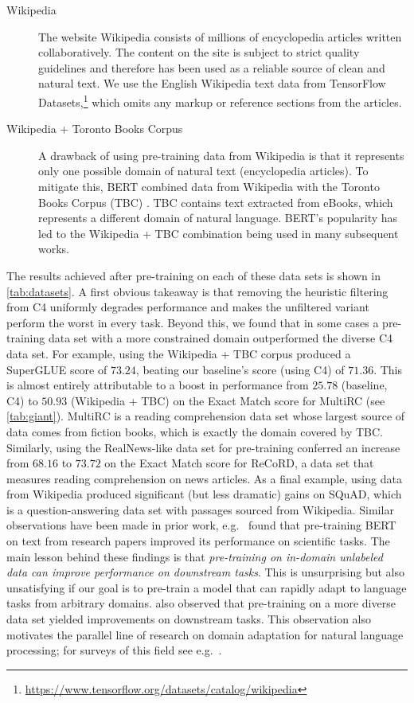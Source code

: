 \begin{description}
\item[Wikipedia] The website Wikipedia consists of millions of encyclopedia articles written collaboratively. The content on the site is subject to strict quality guidelines and therefore has been used as a reliable source of clean and natural text. We use the English Wikipedia text data from TensorFlow Datasets,\footnote{\url{https://www.tensorflow.org/datasets/catalog/wikipedia}} which omits any markup or reference sections from the articles.

\item[Wikipedia + Toronto Books Corpus] A drawback of using pre-training data from Wikipedia is that it represents only one possible domain of natural text (encyclopedia articles). To mitigate this, BERT \citep{devlin2018bert} combined data from Wikipedia with the Toronto Books Corpus (TBC) \citep{zhu2015aligning}. TBC contains text extracted from eBooks, which represents a different domain of natural language. BERT's popularity has led to the Wikipedia + TBC combination being used in many subsequent works.

\end{description}

The results achieved after pre-training on each of these data sets is shown in \ref{tab:datasets}.
A first obvious takeaway is that removing the heuristic filtering from C4 uniformly degrades performance and makes the unfiltered variant perform the worst in every task. Beyond this, we found that in some cases a pre-training data set with a more constrained domain outperformed the diverse C4 data set. For example, using the Wikipedia + TBC corpus produced a SuperGLUE score of $73.24$, beating our baseline's score (using C4) of $71.36$. This is almost entirely attributable to a boost in performance from $25.78$ (baseline, C4) to $50.93$ (Wikipedia + TBC) on the Exact Match score for MultiRC (see \ref{tab:giant}).
MultiRC is a reading comprehension data set whose largest source of data comes from fiction books, which is exactly the domain covered by TBC. Similarly, using the RealNews-like data set for pre-training conferred an increase from $68.16$ to $73.72$ on the Exact Match score for ReCoRD, a data set that measures reading comprehension on news articles. As a final example, using data from Wikipedia produced significant (but less dramatic) gains on SQuAD, which is a question-answering data set with passages sourced from Wikipedia. Similar observations have been made in prior work, e.g.\ \citet{beltagy2019scibert} found that pre-training BERT on text from research papers improved its performance on scientific tasks. The main lesson behind these findings is that \textit{pre-training on in-domain unlabeled data can improve performance on downstream tasks}. This is unsurprising but also unsatisfying if our goal is to pre-train a model that can rapidly adapt to language tasks from arbitrary domains.
\citet{liu2019roberta} also observed that pre-training on a more diverse data set yielded improvements on downstream tasks. This observation also motivates the parallel line of research on domain adaptation for natural language processing; for surveys of this field see e.g.\ \cite{ruder2019neural,li2012literature}.

